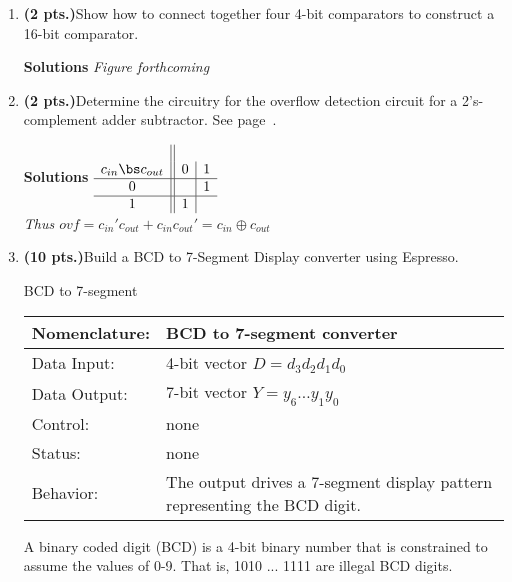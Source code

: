 \begin{enumerate}
\item \textbf{ (2 pts.)}Show how to connect together four 4-bit comparators to
construct a 16-bit comparator.

	\begin{onlysolution} \textbf{Solutions} \itshape{ Figure forthcoming} \end{onlysolution} 

\item \textbf{ (2 pts.)}Determine the circuitry for the overflow detection 
circuit for a 2's-complement adder subtractor.  See page~\pageref{page:Ovf}.

	\begin{onlysolution} \textbf{Solutions} \itshape{
$\begin{array} {c||c|c} \\
 c_{in}  \bs c_{out} & 0 & 1 \\ \hline 
                0    &   & 1 \\ \hline
                1    & 1 &   \\
\end{array}$   \\
Thus $ovf = c_{in}' c_{out} + c_{in} c_{out}' =  c_{in} \oplus c_{out} $
} \end{onlysolution} 


\item \textbf{ (10 pts.)}Build a BCD to 7-Segment Display converter using 
Espresso.  

\begin{buildingblock}{BCD to 7-segment}
\label{page:7seg}
\begin{tabular}{|l|p{3.5in}|} \hline
Nomenclature:  & BCD to 7-segment converter                \\ \hline
Data Input:    & 4-bit vector $D=d_3 d_2 d_1 d_0$  \\ \hline
Data Output:   & 7-bit vector $Y=y_6 \ldots y_1 y_0$    \\ \hline
Control:       & none                                   \\ \hline
Status:        & none                                   \\ \hline
Behavior:      & The output drives a 7-segment display pattern
		 representing the BCD digit.  \\ \hline
\end{tabular}
\end{buildingblock}

A binary coded digit (BCD) is a 4-bit binary number that is constrained
to assume the values of 0-9. That is, 1010 ... 1111 are illegal BCD digits.


\end{enumerate}

